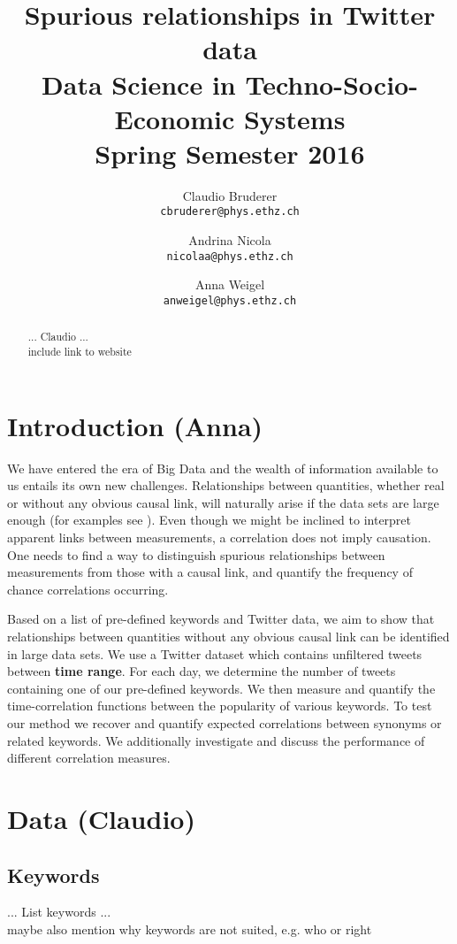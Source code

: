 \documentclass[12pt, a4paper]{article}
\author{
	Claudio Bruderer\\
	\texttt{cbruderer@phys.ethz.ch}
	\and
	Andrina Nicola\\
	\texttt{nicolaa@phys.ethz.ch}
	\and
	Anna Weigel\\
	\texttt{anweigel@phys.ethz.ch}
}
\title{Spurious relationships in Twitter data\\
	 	 \large Data Science in Techno-Socio-Economic Systems\\
	 	 \large Spring Semester 2016}
\begin{document}
\date{}
\maketitle

\begin{abstract}
... Claudio ...\\
include link to website
\end{abstract}


\vspace{0.2in}

\section{Introduction (Anna)}
We have entered the era of Big Data and the wealth of information available to us entails its own new challenges. Relationships between quantities, whether real or without any obvious causal link, will naturally arise if the data sets are large enough (for examples see \cite{tyler_vigen}). Even though we might be inclined to interpret apparent links between measurements, a correlation does not imply causation. One needs to find a way to distinguish spurious relationships between measurements from those with a causal link, and quantify the frequency of chance correlations occurring.

Based on a list of pre-defined keywords and Twitter data, we aim to show that relationships between quantities without any obvious causal link can be identified in large data sets. 
We use a Twitter dataset which contains unfiltered tweets between \textbf{time range}. For each day, we determine the number of tweets containing one of our pre-defined keywords. We then measure and quantify the time-correlation functions between the popularity of various keywords. To test our method we recover and quantify expected correlations between synonyms or related keywords. We  additionally investigate and discuss the performance of different correlation measures.

\section{Data (Claudio)}
\subsection{Keywords}
... List keywords ...\\
maybe also mention why keywords are not suited, e.g. who or right
\end{document}
